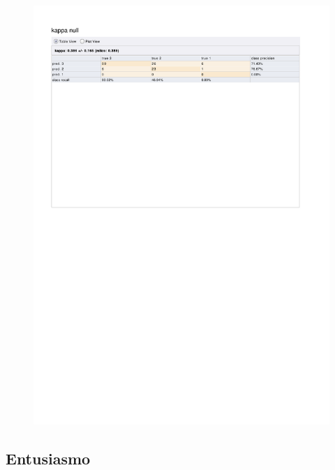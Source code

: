 \begin{figure}[htp]
  \centerline{\includegraphics[trim=0 680 0 80,clip,width=16.09cm]{results/ANN_K_Distraction.pdf}} \caption{
} \label{ANN_K_Distraction}
\end{figure}

\clearpage
\FloatBarrier
\subsection{Entusiasmo}

